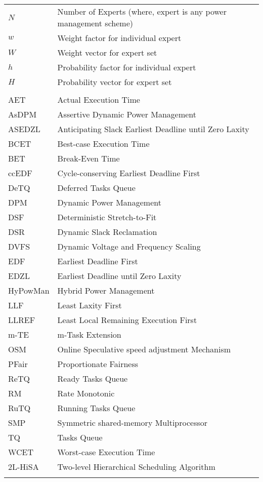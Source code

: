\begin{center}
\begin{longtable}{l p{3.3in}}
$N$	&							Number of Experts (where, expert is any power management scheme)\\
$w$	&							Weight factor for individual expert\\
$W$	&							Weight vector for expert set\\
$h$	&							Probability factor for individual expert\\
$H$	&							Probability vector for expert set\\\\
AET			&					Actual Execution Time\\
AsDPM	&						Assertive Dynamic Power Management\\
ASEDZL	&					Anticipating Slack Earliest Deadline until Zero Laxity\\
BCET			&				Best-case Execution Time\\
BET	&							Break-Even Time\\
ccEDF	&						Cycle-conserving	Earliest Deadline First\\
DeTQ	&						Deferred Tasks Queue\\
DPM		&						Dynamic Power Management\\
DSF		&						Deterministic Stretch-to-Fit\\
DSR	&							Dynamic Slack Reclamation\\
DVFS	&						Dynamic Voltage and Frequency Scaling\\
EDF	&							Earliest Deadline First\\
EDZL &						Earliest Deadline until Zero Laxity\\
HyPowMan	&				Hybrid Power Management\\
LLF		&						Least Laxity First\\
LLREF		&					Least Local Remaining Execution First\\
m-TE	&						m-Task Extension\\
OSM	&							Online Speculative speed adjustment Mechanism\\
PFair	&						Proportionate Fairness\\
ReTQ	&						Ready Tasks Queue\\
RM	&							Rate Monotonic\\
RuTQ	&						Running Tasks Queue\\
SMP	&							Symmetric shared-memory Multiprocessor\\
TQ	&							Tasks Queue\\
WCET			&				Worst-case Execution Time\\
2L-HiSA	&					Two-level Hierarchical Scheduling Algorithm\\\\ \hline











\end{longtable}
\end{center}
